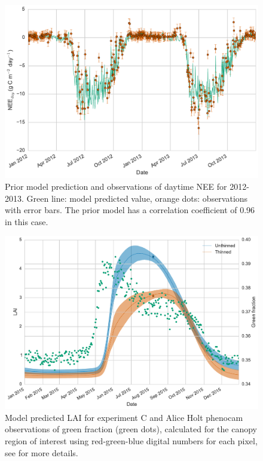 \documentclass[draft,jgrga]{agutexSI}
\begin{document}
 
 \begin{figure}[ht]
 \noindent\includegraphics[width=40pc]{prior.pdf}
    \caption{Prior model prediction and observations of daytime NEE for 2012-2013. Green line: model predicted value, orange dots: observations with error bars. The prior model has a correlation coefficient of 0.96 in this case.} 
    \label{fig:prior_mod}
\end{figure}


\begin{figure}[ht]
 \noindent\includegraphics[width=40pc]{pheno_lai.pdf}
    \caption{Model predicted LAI for experiment C and Alice Holt phenocam observations of green fraction (green dots), calculated for the canopy region of interest using red-green-blue digital numbers for each pixel, see \citet{mizunuma2013relationship} for more details.} \label{fig:pheno_obs}
\end{figure}
\end{document}
